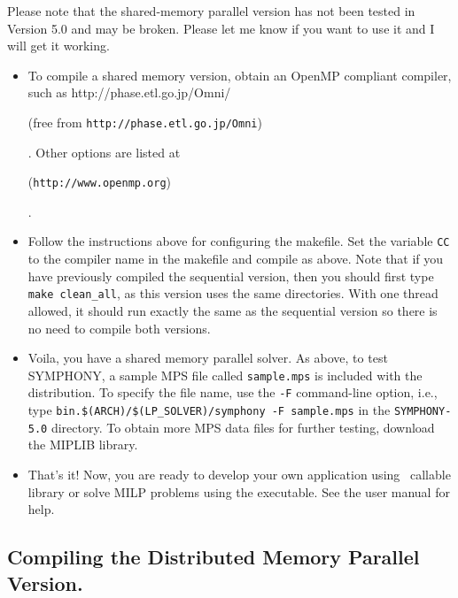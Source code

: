 Please note that the shared-memory parallel version has not been tested in
Version 5.0 and may be broken. Please let me know if you want to use it and I
will get it working. 

\begin{itemize}
        \item To compile a shared memory version, obtain an OpenMP
        compliant compiler, such as 
        {http://phase.etl.go.jp/Omni/}
\begin{latexonly} 
        (free from {\tt http://phase.etl.go.jp/Omni})
\end{latexonly}. 
        Other options are listed at 
\begin{latexonly}
        ({\tt http://www.openmp.org})
\end{latexonly}.

        \item Follow the instructions above for configuring the makefile. Set
the variable {\tt CC} to the compiler name in the makefile and compile as
above. Note that if you have previously compiled the sequential version, then
you should first type {\tt make clean\_all}, as this version uses the same
directories.  With one thread allowed, it should run exactly the same as the
sequential version so there is no need to compile both versions.

        \item Voila, you have a shared memory parallel solver. As above, to
test SYMPHONY, a sample MPS file called \texttt{sample.mps} is included with 
the distribution. To specify the file name, use the \texttt{-F} command-line 
option, i.e., type \texttt{bin.\$(ARCH)/\$(LP\_SOLVER)/symphony -F sample.mps} 
in the \texttt{SYMPHONY-5.0} directory. To obtain more MPS data files for 
further testing, download the MIPLIB library.

\item That's it! Now, you are ready to develop your own application using 
\BB\ callable library or solve MILP problems using the executable. See the
user manual for help.

\end{itemize}

\subsection{Compiling the Distributed Memory Parallel Version.}

